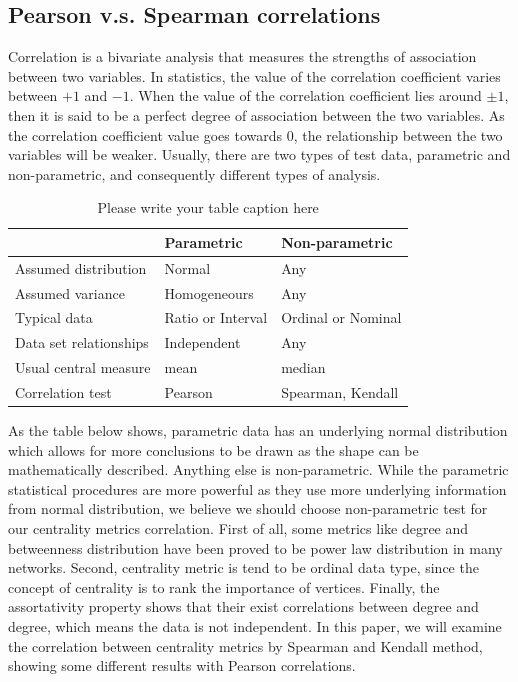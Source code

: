 \documentclass[symmetry,article,submit,moreauthors,pdftex,10pt,a4paper]{Definitions/mdpi}
\begin{document}
\subsection{Pearson v.s. Spearman correlations}
Correlation is a bivariate analysis that measures the strengths of association between two variables. In statistics, the value of the correlation coefficient varies between $+1$ and $-1$. When the value of the correlation coefficient lies around $\pm 1$, then it is said to be a perfect degree of association between the two variables.  As the correlation coefficient value goes towards 0, the relationship between the two variables will be weaker. Usually, there are two types of test data, parametric and non-parametric, and consequently different types of analysis.

%
\begin{table}
	\centering
	\caption{Please write your table caption here}
	\label{tab:1}       %

	\begin{tabular}{lll}
	\toprule
 		& Parametric & Non-parametric  \\
	\midrule
	Assumed distribution & Normal & Any \\
	Assumed variance & Homogeneours & Any \\
	Typical data & Ratio or Interval & Ordinal or Nominal \\
	Data set relationships & Independent & Any \\
	Usual central measure & mean & median \\
	Correlation test & Pearson & Spearman, Kendall\\
	\bottomrule
	\end{tabular}
\end{table}
As the table below shows, parametric data has an underlying normal distribution which allows for more conclusions to be drawn as the shape can be mathematically described. Anything else is non-parametric. While the parametric statistical procedures are more powerful as they use more underlying information from normal distribution, we believe we should choose non-parametric test for our centrality metrics correlation. First of all, some metrics like degree and betweenness distribution have been proved to be power law distribution in many networks. Second, centrality metric is tend to be ordinal data type, since the concept of centrality is to rank the importance of vertices. Finally, the assortativity property shows that their exist correlations between degree and degree, which means the data is not independent. In this paper, we will examine the correlation between centrality metrics by Spearman and Kendall method, showing some different results with Pearson correlations.
\end{document}
